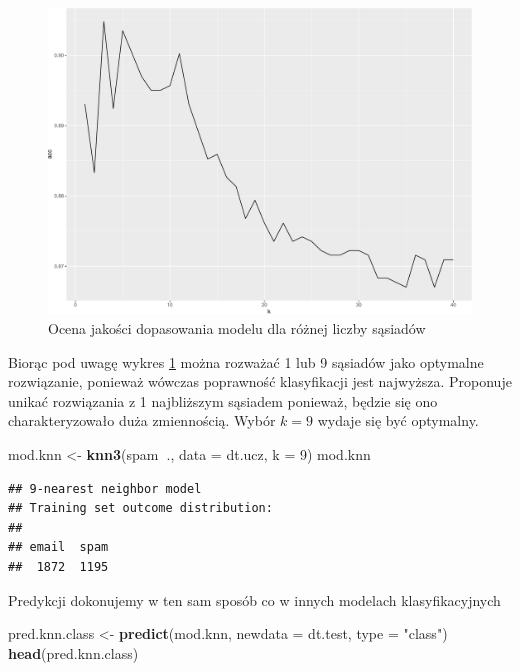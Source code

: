 \documentclass[]{book}
\newenvironment{Shaded}{\begin{snugshade}}{\end{snugshade}}
\newcommand{\DataTypeTok}[1]{\textcolor[rgb]{0.13,0.29,0.53}{#1}}
\newcommand{\DecValTok}[1]{\textcolor[rgb]{0.00,0.00,0.81}{#1}}
\newcommand{\KeywordTok}[1]{\textcolor[rgb]{0.13,0.29,0.53}{\textbf{#1}}}
\newcommand{\NormalTok}[1]{#1}
\newcommand{\OperatorTok}[1]{\textcolor[rgb]{0.81,0.36,0.00}{\textbf{#1}}}
\newcommand{\StringTok}[1]{\textcolor[rgb]{0.31,0.60,0.02}{#1}}
\theoremstyle{plain}
\theoremstyle{definition}
\theoremstyle{definition}
\theoremstyle{definition}
\theoremstyle{definition}
\theoremstyle{remark}
\begin{document}
\begin{figure}

{\centering \includegraphics{EksploracjaDanych_files/figure-latex/knnrys-1} 

}

\caption{Ocena jakości dopasowania modelu dla różnej liczby sąsiadów}\label{fig:knnrys}
\end{figure}

Biorąc pod uwagę wykres \ref{fig:knnrys} można rozważać 1 lub 9 sąsiadów jako optymalne rozwiązanie, ponieważ wówczas poprawność klasyfikacji jest najwyższa. Proponuje unikać rozwiązania z 1 najbliższym sąsiadem ponieważ, będzie się ono charakteryzowało duża zmiennością. Wybór \(k=9\) wydaje się być optymalny.

\begin{Shaded}
\begin{Highlighting}[]
\NormalTok{mod.knn <-}\StringTok{ }\KeywordTok{knn3}\NormalTok{(spam}\OperatorTok{~}\NormalTok{., }\DataTypeTok{data =}\NormalTok{ dt.ucz,}
                \DataTypeTok{k =} \DecValTok{9}\NormalTok{)}
\NormalTok{mod.knn}
\end{Highlighting}
\end{Shaded}

\begin{verbatim}
## 9-nearest neighbor model
## Training set outcome distribution:
## 
## email  spam 
##  1872  1195
\end{verbatim}

Predykcji dokonujemy w ten sam sposób co w innych modelach klasyfikacyjnych

\begin{Shaded}
\begin{Highlighting}[]
\NormalTok{pred.knn.class <-}\StringTok{ }\KeywordTok{predict}\NormalTok{(mod.knn, }\DataTypeTok{newdata =}\NormalTok{ dt.test, }\DataTypeTok{type =} \StringTok{"class"}\NormalTok{)}
\KeywordTok{head}\NormalTok{(pred.knn.class)}
\end{Highlighting}
\end{Shaded}
\end{document}
